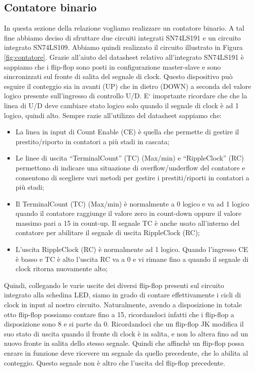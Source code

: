 \subsection*{Contatore binario}

In questa sezione della relazione vogliamo realizzare un contatore binario. A tal fine abbiamo deciso di sfruttare due circuiti integrati SN74LS191 e un circuito integrato SN74LS109. Abbiamo quindi realizzato il circuito illustrato in Figura \ref{fig:contatore}.
Grazie all'aiuto del datasheet relativo all'integrato SN74LS191 è sappiamo che i flip-flop sono posti in configurazione master-slave e sono sincronizzati sul fronte di salita del segnale di clock. Questo dispositivo può esguire il conteggio sia in avanti (UP) che in dietro (DOWN) a seconda del valore logico presente sull'ingresso di controllo U/D. E` imoprtante ricordare che che la linea di U/D deve cambiare stato logico solo quando il segnale di clock è ad 1 logico, quindi alto.
Sempre razie all'utilizzo del datasheet sappiamo che:
\begin{itemize} \itemsep2pt \parskip0pt 
	\item{La linea in input di Count Enable (CE) è quella che permette di gestire il prestito/riporto in contatori a più stadi in cascata;}
	\item{Le linee di uscita ``TerminalCount'' (TC) (Max/min) e ``RippleClock'' (RC) permettono di indicare una situazione di overflow/underflow del contatore e consentono di scegliere vari metodi per gestire i prestiti/riporti in contatori a più stadi;}
	\item{Il TerminalCount (TC) (Max/min) è normalmente a 0 logico e va ad 1 logico quando il contatore raggiunge il valore zero in count-down oppure il valore massimo pari a 15 in count-up. Il segnale TC è anche usato all’interno del contatore per abilitare il segnale di uscita RippleClock (RC);}
	\item{L’uscita RippleClock (RC) è normalmente ad 1 logico. Quando l’ingresso CE è basso e TC è alto l’uscita RC va a 0 e vi rimane fino a quando il segnale di clock ritorna nuovamente alto;}
\end{itemize}

Quindi, collegando le varie uscite dei diversi flip-flop presenti sul circuito integrato alla schedina LED, siamo in grado di contare effettivamente i cicli di clock in input al nostro circuito. Naturalmente, avendo a disposizione in totale otto flip-flop possiamo contare fino a 15, ricordandoci infatti che i flip-flop a disposizione sono 8 e si parte da 0.
Ricordandoci che un flip-flop JK modifica il suo stato di uscita quando il fronte di clock è in salita, e non lo altera fino ad un nuovo fronte in salita dello stesso segnale.
Quindi che affinchè un flip-flop possa enrare in funzione deve ricevere un segnale da quello precedente, che lo abilita al conteggio. Questo segnale non è altro che l'uscita del flip-flop precedente.

